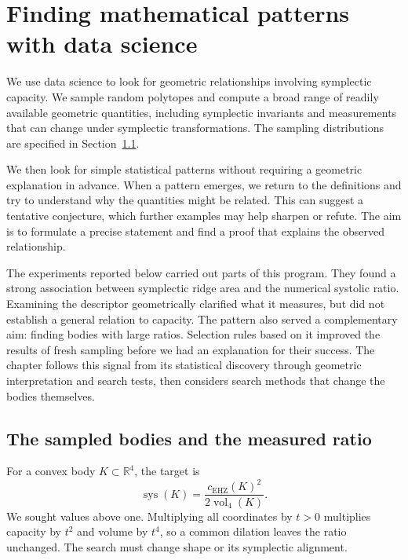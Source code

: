 \section{Finding mathematical patterns with data science}
\label{sec:fresh-data-search}
\label{sec:black-box-datascience}

We use data science to look for geometric relationships involving symplectic
capacity. We sample random polytopes and compute a broad range of readily
available geometric quantities, including symplectic invariants and
measurements that can change under symplectic transformations. The sampling
distributions are specified in Section~\ref{subsec:ds-sampling}.

We then look for simple statistical patterns without requiring a geometric
explanation in advance. When a pattern emerges, we return to the definitions
and try to understand why the quantities might be related. This can suggest
a tentative conjecture, which further examples may help sharpen or refute.
The aim is to formulate a precise statement and find a proof that explains
the observed relationship.

The experiments reported below carried out parts of this program. They
found a strong association between symplectic ridge area and the numerical
systolic ratio. Examining the descriptor geometrically clarified what it
measures, but did not establish a general relation to capacity. The pattern
also served a complementary aim: finding bodies with large ratios.
Selection rules based on it improved the results of fresh sampling before
we had an explanation for their success. The chapter follows this signal
from its statistical discovery through geometric interpretation and search
tests, then considers search methods that change the bodies themselves.

\subsection{The sampled bodies and the measured ratio}
\label{subsec:ds-sampling}

For a convex body $K\subset\mathbb R^4$, the target is
\[
 \operatorname{sys}(K)=\frac{c_{\mathrm{EHZ}}(K)^2}{2\operatorname{vol}_4(K)}.
\]
We sought values above one. Multiplying all coordinates by $t>0$ multiplies
capacity by $t^2$ and volume by $t^4$, so a common dilation leaves the ratio
unchanged. The search must change shape or its symplectic alignment.

